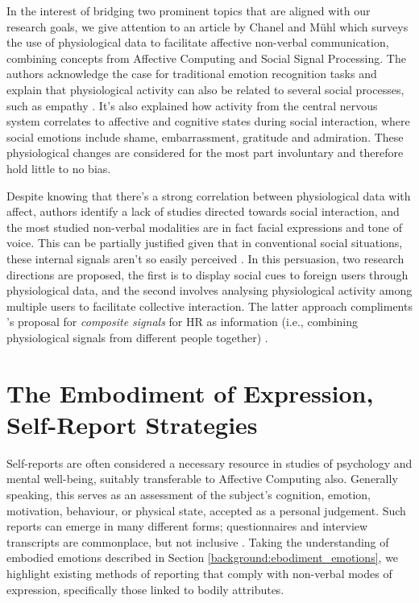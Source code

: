In the interest of bridging two prominent topics that are aligned with our research goals, we give attention to an article by Chanel and Mühl \cite{chanel_connecting_2015} which surveys the use of physiological data to facilitate affective non-verbal communication, combining concepts from Affective Computing and Social Signal Processing. The authors acknowledge the case for traditional emotion recognition tasks and explain that physiological activity can also be related to several social processes, such as empathy \cite{levenson_empathy_1992}. It's also explained how activity from the central nervous system correlates to affective and cognitive states during social interaction, where social emotions include shame, embarrassment, gratitude and admiration. These physiological changes are considered for the most part involuntary and therefore hold little to no bias.

Despite knowing that there's a strong correlation between physiological data with affect, authors identify a lack of studies directed towards social interaction, and the most studied non-verbal modalities are in fact facial expressions and tone of voice. This can be partially justified given that in conventional social situations, these internal signals aren't so easily perceived \cite{vinciarelli_social_2009}. In this persuasion, two research directions are proposed, the first is to display social cues to foreign users through physiological data, and the second involves analysing physiological activity among multiple users to facilitate collective interaction. The latter approach compliments \citeauthor{slovak_understanding_2012}'s proposal for \textit{composite signals} for HR as information (i.e., combining physiological signals from different people together) \cite{slovak_understanding_2012}.

\section{The Embodiment of Expression, Self-Report Strategies}

Self-reports are often considered a necessary resource in studies of psychology and mental well-being, suitably transferable to Affective Computing also. Generally speaking, this serves as an assessment of the subject's cognition, emotion, motivation, behaviour, or physical state, accepted as a personal judgement. Such reports can emerge in many different forms; questionnaires and interview transcripts are commonplace, but not inclusive \cite{barker_self-report_2016}. Taking the understanding of embodied emotions described in Section \ref{background:ebodiment_emotions}, we highlight existing methods of reporting that comply with non-verbal modes of expression, specifically those linked to bodily attributes.

